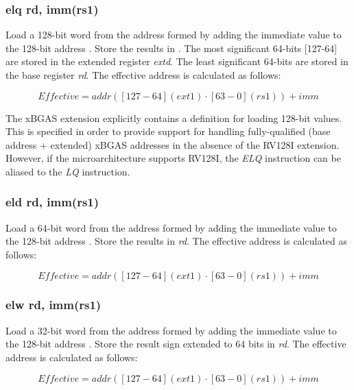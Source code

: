 \documentclass{article}
\begin{document}
\subsubsection{elq rd, imm(rs1)}
Load a 128-bit word from the address formed by adding the immediate value to the 
128-bit address .  Store the results in .  The most 
significant 64-bits [127-64] are stored in the extended register \textit{extd}.  The least 
significant 64-bits are stored in the base register \textit{rd}.  The effective 
address is calculated as follows: 

\begin{equation}
Effective = addr([127-64](ext1) \cdot [63-0](rs1))+imm
\end{equation}

\begin{commentary}
The xBGAS extension explicitly contains a definition for loading 128-bit values.  
This is specified in order to provide support for handling fully-qualified (base 
address + extended) xBGAS addresses in the absence of the RV128I extension.  However, 
if the microarchitecture supports RV128I, the \textit{ELQ} instruction can be aliased 
to the \textit{LQ} instruction.
\end{commentary}


\subsubsection{eld rd, imm(rs1)}
Load a 64-bit word from the address formed by adding the immediate value to the 
128-bit address .  Store the results in \textit{rd}.  The effective 
address is calculated as follows: 

\begin{equation}
Effective = addr([127-64](ext1) \cdot [63-0](rs1))+imm
\end{equation}

\subsubsection{elw rd, imm(rs1)}
Load a 32-bit word from the address formed by adding the immediate value to the 
128-bit address .  Store the result sign extended to 64 bits in \textit{rd}.  The effective 
address is calculated as follows: 

\begin{equation}
Effective = addr([127-64](ext1) \cdot [63-0](rs1))+imm
\end{equation}
\end{document}
